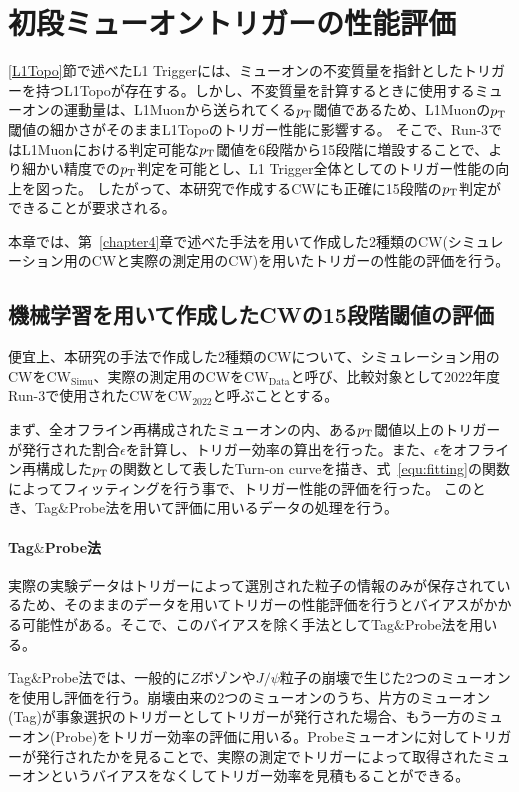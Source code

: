 \chapter{初段ミューオントリガーの性能評価}\label{chapter5}
\ref{L1Topo}節で述べたL1 Triggerには、ミューオンの不変質量を指針としたトリガーを持つL1Topoが存在する。しかし、不変質量を計算するときに使用するミューオンの運動量は、L1Muonから送られてくる$p_{\rm{T}}$閾値であるため、L1Muonの$p_{\rm{T}}$閾値の細かさがそのままL1Topoのトリガー性能に影響する。
そこで、Run-3ではL1Muonにおける判定可能な$p_{\rm{T}}$閾値を6段階から15段階に増設することで、より細かい精度での$p_{\rm{T}}$判定を可能とし、L1 Trigger全体としてのトリガー性能の向上を図った。
したがって、本研究で作成するCWにも正確に15段階の$p_{\rm{T}}$判定ができることが要求される。

本章では、第~\ref{chapter4}章で述べた手法を用いて作成した2種類のCW(シミュレーション用のCWと実際の測定用のCW)を用いたトリガーの性能の評価を行う。

\section{機械学習を用いて作成したCWの15段階閾値の評価}
便宜上、本研究の手法で作成した2種類のCWについて、シミュレーション用のCWを$\mathrm{CW_{Simu}}$、実際の測定用のCWを$\mathrm{CW_{Data}}$と呼び、比較対象として2022年度Run-3で使用されたCWを$\mathrm{CW_{2022}}$と呼ぶこととする。

まず、全オフライン再構成されたミューオンの内、ある$p_{\rm{T}}$閾値以上のトリガーが発行された割合$\epsilon$を計算し、トリガー効率の算出を行った。また、$\epsilon$をオフライン再構成した$p_{\rm{T}}$の関数として表したTurn-on curveを描き、式~\eqref{equ:fitting}の関数によってフィッティングを行う事で、トリガー性能の評価を行った。
このとき、Tag$\&$Probe法を用いて評価に用いるデータの処理を行う。
\subsubsection{Tag$\&$Probe法}
実際の実験データはトリガーによって選別された粒子の情報のみが保存されているため、そのままのデータを用いてトリガーの性能評価を行うとバイアスがかかる可能性がある。そこで、このバイアスを除く手法としてTag$\&$Probe法を用いる。

Tag$\&$Probe法では、一般的に$Z$ボゾンや$J/\psi$粒子の崩壊で生じた2つのミューオンを使用し評価を行う。崩壊由来の2つのミューオンのうち、片方のミューオン(Tag)が事象選択のトリガーとしてトリガーが発行された場合、もう一方のミューオン(Probe)をトリガー効率の評価に用いる。Probeミューオンに対してトリガーが発行されたかを見ることで、実際の測定でトリガーによって取得されたミューオンというバイアスをなくしてトリガー効率を見積もることができる。

